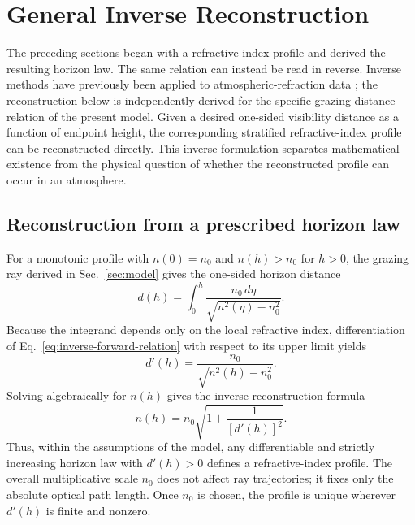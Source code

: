 \section{General Inverse Reconstruction}
\label{sec:inverse-reconstruction}

The preceding sections began with a refractive-index profile and derived the
resulting horizon law. The same relation can instead be read in reverse.
Inverse methods have previously been applied to atmospheric-refraction data
\cite{rees1991inversion}; the reconstruction below is independently derived
for the specific grazing-distance relation of the present model. Given a
desired one-sided visibility distance as a function of endpoint height, the
corresponding stratified refractive-index profile can be reconstructed
directly. This inverse formulation separates mathematical existence from
the physical
question of whether the reconstructed profile can occur in an atmosphere.

\subsection{Reconstruction from a prescribed horizon law}

For a monotonic profile with $n(0)=n_0$ and $n(h)>n_0$ for $h>0$, the grazing
ray derived in Sec.~\ref{sec:model} gives the one-sided horizon distance
\begin{equation}
    d(h)
    =
    \int_0^h
    \frac{n_0\,d\eta}
    {\sqrt{n^2(\eta)-n_0^2}}.
    \label{eq:inverse-forward-relation}
\end{equation}
Because the integrand depends only on the local refractive index,
differentiation of Eq.~\eqref{eq:inverse-forward-relation} with respect to
its upper limit yields
\begin{equation}
    d'(h)
    =
    \frac{n_0}
    {\sqrt{n^2(h)-n_0^2}}.
    \label{eq:horizon-law-derivative}
\end{equation}
Solving algebraically for $n(h)$ gives the inverse reconstruction formula
\begin{equation}
    n(h)
    =
    n_0
    \sqrt{
        1+\frac{1}{[d'(h)]^2}
    }.
    \label{eq:general-inverse-reconstruction}
\end{equation}
Thus, within the assumptions of the model, any differentiable and strictly
increasing horizon law with $d'(h)>0$ defines a refractive-index profile. The
overall multiplicative scale $n_0$ does not affect ray trajectories; it fixes
only the absolute optical path length. Once $n_0$ is chosen, the profile is
unique wherever $d'(h)$ is finite and nonzero.

